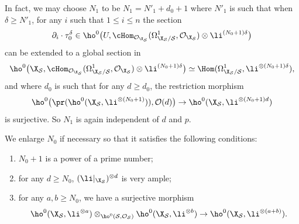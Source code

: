 In fact, we may choose $N_1$ to be $N_1\!=\!N'_1+d_0+1$ where $N'_1$ is such that when \hbox{$\delta\!\geq\!N'_1$}, for any $i$ such that $1\leq i\leq n$ the section\vspace*{-3pt}
\[
\partial_i\cdot \tau_0^{\delta}\in \ho^0\bigl(U, \cHom_{\mathcal{O}_{\X_\mathcal{S}}}(\Omega^1_{\X_\mathcal{S}/\mathcal{S}}, \mathcal{O}_{\X_\mathcal{S}})\otimes \li^{(N_0+1)\delta} \bigr)
\]
can be extended to a global section in\vspace*{-3pt}
\[
\ho^0\bigl(\X_\mathcal{S}, \cHom_{\mathcal{O}_{\X_\mathcal{S}}}(\Omega^1_{\X_\mathcal{S}/\mathcal{S}}, \mathcal{O}_{\X_\mathcal{S}})\otimes \li^{(N_0+1)\delta} \bigr)\simeq \Hom(\Omega^1_{\X_\mathcal{S}/\mathcal{S}}, \li^{\otimes(N_0+1)\delta}),
\]
and where $d_0$ is such that for any $d\geq d_0$, the restriction morphism
\[
\ho^0\bigl(\pr(\ho^0(\X_{\mathcal{S}}, \li^{\otimes (N_0+1)})),\mathcal{O}(d)\bigr) \to \ho^0(\X_{\mathcal{S}}, \li^{\otimes (N_0+1)d})
\]
is surjective. So $N_1$ is again independent of $d$ and $p$.

We enlarge $N_0$ if necessary so that it satisfies the following conditions:
\begin{enumerate}
\item $N_0+1$ is a power of a prime number;
\item for any $d\geq N_0$, $(\li |_{\X_\mathcal{S}})^{\otimes d}$ is very ample;
\item for any $a,b\geq N_0$, we have a surjective morphism
\[
\ho^0(\X_{\mathcal{S}}, \li^{\otimes a}) \otimes_{\ho^0(\mathcal{S}, \mathcal{O}_{\mathcal{S}})}\ho^0(\X_{\mathcal{S}}, \li^{\otimes b})\to \ho^0(\X_{\mathcal{S}}, \li^{\otimes (a+b)}).
\]
\end{enumerate}

